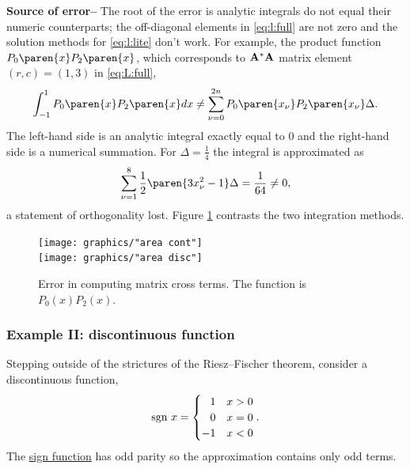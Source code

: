 \documentclass[conference]{worldcomp}
\begin{document}
\textbf{Source of error--}
The root of the error is analytic integrals do not equal their numeric counterparts; the off-diagonal elements in \eqref{eq:l:full} are not zero and the solution methods for \eqref{eq:l:lite} don't work. For example, the product function $P_{0}\paren{x} P_{2}\paren{x}$, which corresponds to $\mathbf{A}^{\rm{*}}\mathbf{A}^{\rm{}}$ matrix element $(r,c) = (1,3)$ in  \eqref{eq:L:full}, 
  \begin{equation}
    \int_{-1}^{1}{P_{0}\paren{x} P_{2}\paren{x} dx} \ne \sum_{\nu=0}^{2n} P_{0}\paren{x_{\nu}} P_{2}\paren{x_{\nu}} \Delta .
  \end{equation}
The left-hand side is an analytic integral exactly equal to 0 and the right-hand side is a numerical summation. For $\Delta = \frac{1} {4}$ the integral is approximated as
  \begin{equation*}
    \sum_{\nu=1}^{8} \frac{1}{2}  \paren{ 3x_{\nu}^{2} - 1 } \Delta = \frac{1}{64} \ne 0,
  \end{equation*}
a statement of orthogonality lost.
Figure \ref{fig:compare errors} contrasts the two integration methods.


\begin{figure}[htbp] %
   \centering
   \texttt{[image: graphics/"area cont"]} \\[10pt]
   \texttt{[image: graphics/"area disc"]} 
   \caption{Error in computing matrix cross terms. The function is $P_{0}(x)P_{2}(x)$.} %
   \label{fig:compare errors}
\end{figure}


\subsubsection{\label{sec:infinity insurance}Example II: discontinuous function}
Stepping outside of the strictures of the Riesz--Fischer theorem, consider a discontinuous function,
  \begin{equation}
    \text{sgn } x = 
    \begin{cases}
      \phantom{-}1 & x > 0 \\
      \phantom{-}0 & x = 0 \\
                -1 & x < 0
    \end{cases} .
    \label{eqn:sgn}
  \end{equation}
The \href{http://mathworld.wolfram.com/Sign.html}{sign function} has odd parity so the approximation contains only odd terms.
\end{document}
